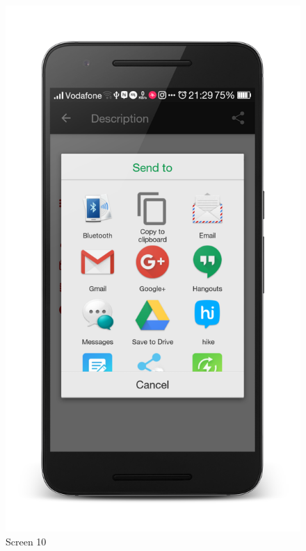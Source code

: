 \begin{figure}[ht]
\centering
\includegraphics[scale=0.13]{images/d17.png}
\caption{Screen 10}
\end{figure}

\newpage

